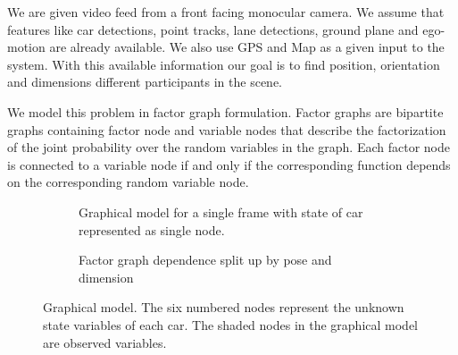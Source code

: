 We are given video feed from a front facing monocular camera. We assume that features like car detections, point tracks, lane detections, ground plane and ego-motion are already available. We also use GPS and Map as a given input to the system. With this available information our goal is to find position, orientation and dimensions different participants in the scene.

We model this problem in factor graph formulation. Factor graphs are bipartite graphs containing factor node and variable nodes that describe the factorization of the joint probability over the random variables in the graph. Each factor node is connected to a variable node if and only if the corresponding function depends on the corresponding random variable node.

\begin{figure*}
  \centering
  \newcommand{\imagewidth}{\textwidth}
  
  \caption{A sample road scene with the unknowns of each car modeled as random variables. 
  The relating energies are shown in Figure~\ref{fig:graphmodel}}
\end{figure*}
\begin{figure}
  \begin{subfigure}[b]{0.55\textwidth}
    
    \caption{Graphical model for a single frame with state of car represented
    as single node.}
  \end{subfigure}
  \begin{subfigure}[b]{0.45\textwidth}
    \tikzset{/tikz/x=0.8cm,/tikz/y=0.8cm}
    
    \caption{Factor graph dependence split up by pose and dimension}
  \end{subfigure}
\caption{Graphical model. The six numbered nodes represent the unknown state variables of each car. The shaded nodes in the graphical model are observed variables. %
}
  \label{fig:graphmodel}
\end{figure}
